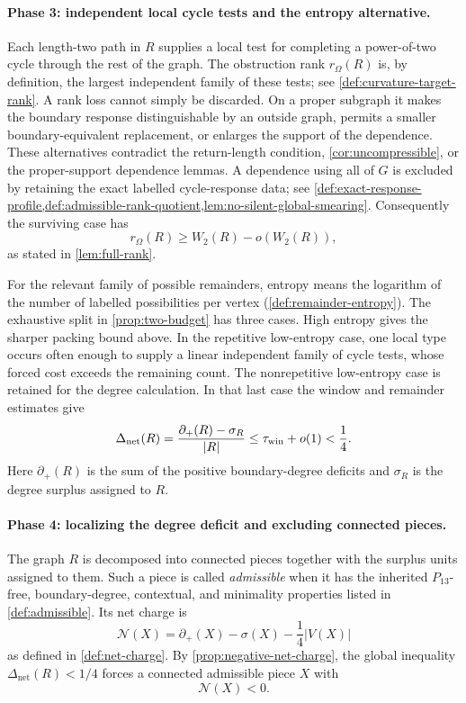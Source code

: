 \documentclass[11pt]{article}
\newcommand{\defp}{\partial_+}
\newcommand{\No}{\mathcal N}
\begin{document}
\paragraph{Phase 3: independent local cycle tests and the entropy alternative.}
Each length-two path in $R$ supplies a local test for completing a
power-of-two cycle through the rest of the graph.  The obstruction rank
$r_\Omega(R)$ is, by definition, the largest independent family of these
tests; see \cref{def:curvature-target-rank}.  A rank loss cannot simply be
discarded.  On a proper subgraph it makes the boundary response distinguishable
by an outside graph, permits a smaller boundary-equivalent replacement, or
enlarges the support of the dependence.  These alternatives contradict the
return-length condition, \cref{cor:uncompressible}, or the proper-support
dependence lemmas.  A dependence using all of $G$ is excluded by retaining the
exact labelled cycle-response data; see
\cref{def:exact-response-profile,def:admissible-rank-quotient,lem:no-silent-global-smearing}.
Consequently the surviving case has
\[
r_\Omega(R)\ge W_2(R)-o(W_2(R)),
\]
as stated in \cref{lem:full-rank}.

For the relevant family of possible remainders, entropy means the logarithm
of the number of labelled possibilities per vertex
(\cref{def:remainder-entropy}).  The exhaustive split in
\cref{prop:two-budget} has three cases.  High entropy gives the sharper packing
bound above.  In the repetitive low-entropy case, one local type occurs often
enough to supply a linear independent family of cycle tests, whose forced cost
exceeds the remaining count.  The nonrepetitive low-entropy case is retained
for the degree calculation.  In that last case the window and remainder
estimates give
\[
\Delta_{\mathrm{net}}(R)
=\frac{\defp(R)-\sigma_R}{|R|}
\le \tau_{\rm win}+o(1)<\frac14 .
\]
Here $\defp(R)$ is the sum of the positive boundary-degree deficits and
$\sigma_R$ is the degree surplus assigned to $R$.

\paragraph{Phase 4: localizing the degree deficit and excluding connected pieces.}
The graph $R$ is decomposed into connected pieces together with the surplus
units assigned to them.  Such a piece is called \emph{admissible} when it has
the inherited $P_{13}$-free, boundary-degree, contextual, and minimality
properties listed in \cref{def:admissible}.  Its net charge is
\[
\No(X)=\defp(X)-\sigma(X)-\frac14|V(X)|
\]
as defined in \cref{def:net-charge}.  By \cref{prop:negative-net-charge}, the
global inequality $\Delta_{\mathrm{net}}(R)<1/4$ forces a connected
admissible piece $X$ with
\[
\No(X)<0 .
\]
\end{document}
